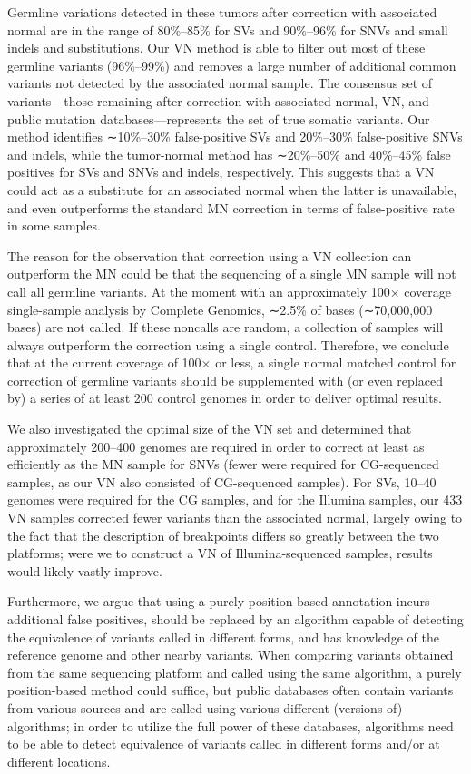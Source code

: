 Germline variations detected in these tumors after correction with associated normal are in the range of 80\%–85\% for SVs and 90\%–96\% for SNVs and small indels and substitutions. Our VN method is able to filter out most of these germline variants (96\%–99\%) and removes a large number of additional common variants not detected by the associated normal sample. The consensus set of variants—those remaining after correction with associated normal, VN, and public mutation databases—represents the set of true somatic variants. Our method identifies ∼10\%–30\% false-positive SVs and 20\%–30\% false-positive SNVs and indels, while the tumor-normal method has ∼20\%–50\% and 40\%–45\% false positives for SVs and SNVs and indels, respectively. This suggests that a VN could act as a substitute for an associated normal when the latter is unavailable, and even outperforms the standard MN correction in terms of false-positive rate in some samples.

The reason for the observation that correction using a VN collection can outperform the MN could be that the sequencing of a single MN sample will not call all germline variants. At the moment with an approximately 100× coverage single-sample analysis by Complete Genomics, ∼2.5\% of bases (∼70,000,000 bases) are not called. If these noncalls are random, a collection of samples will always outperform the correction using a single control. Therefore, we conclude that at the current coverage of 100× or less, a single normal matched control for correction of germline variants should be supplemented with (or even replaced by) a series of at least 200 control genomes in order to deliver optimal results.

We also investigated the optimal size of the VN set and determined that approximately 200–400 genomes are required in order to correct at least as efficiently as the MN sample for SNVs (fewer were required for CG-sequenced samples, as our VN also consisted of CG-sequenced samples). For SVs, 10–40 genomes were required for the CG samples, and for the Illumina samples, our 433 VN samples corrected fewer variants than the associated normal, largely owing to the fact that the description of breakpoints differs so greatly between the two platforms; were we to construct a VN of Illumina-sequenced samples, results would likely vastly improve.

Furthermore, we argue that using a purely position-based annotation incurs additional false positives, should be replaced by an algorithm capable of detecting the equivalence of variants called in different forms, and has knowledge of the reference genome and other nearby variants. When comparing variants obtained from the same sequencing platform and called using the same algorithm, a purely position-based method could suffice, but public databases often contain variants from various sources and are called using various different (versions of) algorithms; in order to utilize the full power of these databases, algorithms need to be able to detect equivalence of variants called in different forms and/or at different locations.

